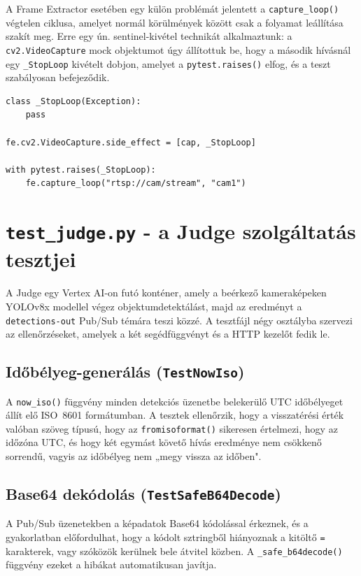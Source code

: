 \documentclass[12pt,a4paper]{article}
\begin{document}
A Frame Extractor esetében egy külön problémát jelentett a \texttt{capture\_loop()}
végtelen ciklusa, amelyet normál körülmények között csak a folyamat leállítása
szakít meg. Erre egy ún. sentinel-kivétel technikát alkalmaztunk: a
\texttt{cv2.VideoCapture} mock objektumot úgy állítottuk be, hogy a második
hívásnál egy \texttt{\_StopLoop} kivételt dobjon, amelyet a \texttt{pytest.raises()}
elfog, és a teszt szabályosan befejeződik.

\begin{lstlisting}[caption={Sentinel-kivétel a végtelen capture ciklus megtöréséhez}]
class _StopLoop(Exception):
    pass

fe.cv2.VideoCapture.side_effect = [cap, _StopLoop]

with pytest.raises(_StopLoop):
    fe.capture_loop("rtsp://cam/stream", "cam1")
\end{lstlisting}

\section{\texttt{test\_judge.py} - a Judge szolgáltatás tesztjei}

A Judge egy Vertex AI-on futó konténer, amely a beérkező kameraképeken YOLOv8x
modellel végez objektumdetektálást, majd az eredményt a \texttt{detections-out}
Pub/Sub témára teszi közzé. A tesztfájl négy osztályba szervezi az ellenőrzéseket,
amelyek a két segédfüggvényt és a HTTP kezelőt fedik le.

\subsection{Időbélyeg-generálás (\texttt{TestNowIso})}

A \texttt{now\_iso()} függvény minden detekciós üzenetbe belekerülő UTC időbélyeget
állít elő ISO~8601 formátumban. A tesztek ellenőrzik, hogy a visszatérési érték
valóban szöveg típusú, hogy az \texttt{fromisoformat()} sikeresen értelmezi,
hogy az időzóna UTC, és hogy két egymást követő hívás eredménye nem csökkenő
sorrendű, vagyis az időbélyeg nem „megy vissza az időben".

\subsection{Base64 dekódolás (\texttt{TestSafeB64Decode})}

A Pub/Sub üzenetekben a képadatok Base64 kódolással érkeznek, és a gyakorlatban
előfordulhat, hogy a kódolt sztringből hiányoznak a kitöltő \texttt{=} karakterek,
vagy szóközök kerülnek bele átvitel közben. A \texttt{\_safe\_b64decode()} függvény
ezeket a hibákat automatikusan javítja.
\end{document}
